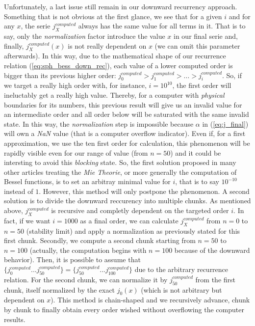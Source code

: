 \documentclass{article}
\numberwithin{equation}{section}
\begin{document}
Unfortunately, a last issue still remain in our downward recurrency approach. Something that is not obvious at the first glance, we see that for a given $i$ and for any $x$, the serie $j^{computed}_{X}$ always has the same value for all terms in it. That is to say, only the \textit{normalization} factor introduce the value $x$ in our final serie and, finally, $j^{computed}_{X}(x)$ is not really dependent on $x$ (we can omit this parameter afterwards). In this way, due to the mathematical shape of our recurrence relation (\ref{eq:sph_bess_down_rec}), each value of a lower computed order is bigger than its previous higher order: $j^{computed}_{0} > j^{computed}_{1} > ... > j^{computed}_{i}$. So, if we target a really high order with, for instance, $i=10^{10}$, the first order will ineluctably get a really high value. Thereby, for a computer with \textit{physical} boundaries for its numbers, this previous result will give us an invalid value for an intermediate order and all order below will be saturated with the same invalid state. In this way, the \textit{normalization} step is impossible because $\alpha$ in (\ref{eq:j_final}) will own a \textit{NaN} value (that is a computer overflow indicator). Even if, for a first approximation, we use the ten first order for calculation, this phenomenon will be rapidly visible even for our range of value (from $n=50$) and it could be intersting to avoid this \textit{blocking} state. So, the first solution proposed in many other articles treating the \textit{Mie Theorie}, or more generally the computation of Bessel functions, is to set an arbitray minimal value for $i$, that is to say $10^{-10}$ instead of $1$. However, this method will only postpone the phenomenon. A second solution is to divide the downward reccurency into multiple chunks. As mentioned above, $j^{computed}_{X}$ is recursive and completly dependent on the targeted order $i$. In fact, if we want $i=1000$ as a final order, we can calculate $j^{computed}_{X}$ from $n=0$ to $n=50$ (stability limit) and apply a normalization as previously stated for this first chunk. Secondly, we compute a second chunk starting from $n=50$ to $n=100$ (actually, the computation begins with $n=100$ because of the downward behavior). Then, it is possible to assume that $\{j^{computed}_{0}...j^{computed}_{50}\} = \{j^{computed}_{50}...j^{computed}_{100}\}$ due to the arbitrary recurrence relation. For the second chunk, we can normalize it by $j^{computed}_{50}$ from the first chunk, itself normalized by the exact $j_{0}(x)$ (which is not arbitrary but dependent on $x$). This method is chain-shaped and we recursively advance, chunk by chunk to finally obtain every order wished without overflowing the computer results.
\end{document}

